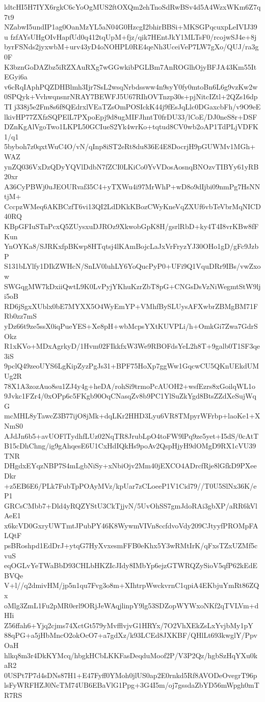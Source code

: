 ldtcHI5H7IYX6rgkC6cYoOgMUS2ftOXQm2ehTnoSdRwBSv4d5A4WzxWKm6Z7q7t9
NZabwI5undIP1ag0OanMzYL5aN04G0HzcgI2bhirBBSi+MKSGPqcuxpLeIVIJ39u
fzfAYsUHgOIvHapfUd0q412tqUpM+fjz/qik7HEntJkY1MLTsF0/rcojwSJ4e+8j
byrFSNds2jyxwbM+urv43yD4oNOHPL0RE4qeNh3UceiVeP7LW7gXo/QUJ/ra3g0F
K3bznGoDAZbz5iRZXAuRXg7wGGwkibPGLBm7AnROGlhOjyBFJA43Km55ItEGyi6a
v6cRqIAphPQZDHBlmh3Ijr7SsL2wsqNrbdssww4n9syY0fy0mtoBn6L6g9vzKw2w
0SPQyk+VvhwqnsnrNRAY7BEWFJ5U67RIhOVTnzp30s+pjNitcIZtl+2QZs16dpTI
j338j5e2Fm8s6f8QEdrxlVEaTZsOmPOSIckK44j9fEsJqLlc0DGaxcbFh/v9O9eE
lkivHP77ZXfzSQPElL7PXpoEpj9d8ugMIFJhntT0frDU33/lCoE/DJ0neS8r+DSF
DZnKgAlVgoTwo1LKPL50GCIueS2Yk4wrKo+tqtud8CV0wb2oAP1TdPLjVDFK1/q1
5byboh7z0qxtWuC4O/vN/qInp8iST2eRt8du836E4E8DocrjH9pGUWMv1MGh+WAZ
ynZQ036VxDzQDyYQVlDdbN7fZCI0LKiCo0YvVDosAosnqBNOzvTIBYy61yRB20xr
A36CyPBWj0uJEOURvaf35C4+yTXWu4i97MrWhP+wD8o9dIjbi09nmPg7HsNNtjM+
CccpzWMeq6AKBCzfT6vi13QI2LdDKkKBozCWyKneVqZXUf6vbTeVbrMqNICD40RQ
KBpGFIuSTnPcxQ5ZUysxuDJROz9XkwobGpK8H/gsrlRbD+ky4T4I8vrKBw8fFKun
YnOYKa8/SJRKxfpBKwp8HTqtsj4lKAmBojcLaJxVrFryzYJ30OHo1gD/gFc9JzbP
S131bLYlfy1DIkZWHcN/SnLV0luhLY6YoQucPyP0+UFi9Q1VquDRr9IBs/vwZxow
SWGqgMW7kDxiiQwtL9K0LvPyjYKhuKzrZbT8pG+CNGsDsVzNiWegmtStW9lji5oB
RD6jSgxXUblx0bE7MYXX5O4WyEmYP+VMhfBySLUysAFXwbrZBMgBM71FRb0zz7mS
yDz66t9ze5ssX0iqPueYES+Xe8pH+wbMcpsYXtKUVPLi/h+OmkGi7Zwa7GdrSOkz
R1xKVo+MDxAgrkyD/1Hvm02FIkkfxW3We9RBOFdsYeL2h8T+9galb0T1SF3qe3iS
9pclQ49zeoUYS6LgKipZyzPgJs31+BPF75HoXp7ggWw1GqcwCU5QKnUEkdUMUg2R
78X1A3zozAuo8su1ZJ4y4g+heDA/rohSi9trmoPcAUOH2+wsfEzrs8xGoilqWL1o
9Jvkc1FZr4/0xOPp6c5FKgb90OqCNasqZv8b9PC1YlSuZkYgd8BtsZZdXeSujWqG
mcMHL8yTawcZ3B77ijO8jMk+dqLKr2HHD3Lyu6VR8TMpyrWFrbp+laoKe1+XNmS0
AJdJn6b5+avUOFlTydhfLUz02NqTR8JrubLpO4toFW9lPq9ze5yet+I5dS/0cAtT
B15cDhChng/ig9gAhqesE6U1CxHdIQkHs9poAv2QspHjyH9dOMgD9RX1cVU39TNR
DHgdxEYqzNBP7S4mLgbNiSy+xNbiOjv2Mm40jEXCO4ADrcfRje8lGfkD9PXeeDkr
+z5EB6E6/PLk7FubTpPOAyMVz/kpUar7zCLoeeP1V1Cid79//T0U5SlNx36K/eP1
GRCsCMbb7+Dld4yRQZYStU3CkTjjvN/5UvOhSS7gmJdoRAi3gbXP/aRR6kVlAeE1
x6kcVD0GxryUWTmtJPubPY46K8WywmVIVn8ccfdvoVdy209CJtyyfPROMpFALQtF
psBRoshpd1EdDrJ+ytqG7HyXvxesmFFB0eKhx5Y3wRMtIrK/qFxsTZxUZMf5cvuS
eqOGLvYeTWaBbD93CHLbHKZIcJIdy8IMbYp6ejzGTWRQZySioV5qfP62kEdEBVQe
V+l//q2dmivHM/jp5n1qu7Fvg3o8m+XIhtrpWwckvrnC1qpiA4EKbjuYmRt86ZQx
oMlg3ZmL1Fu2pMR0erl9ORjJeWAqjlinpY9lg53SDZopWYWxoNKf2qTVLVm+dHIi
Z56ffah6+Yjq2cjms74XctGt579yMvfflvjvG1HRYx/7O2VhXEkZsLxYvjbMy1pY
88qPG+a5jHbMncO2okOcO7+a7gdXz/k93LCEd8JXKBF/QHlLt693kwglY/PpvOaH
hlkq8m3r4DkKYMcq/hbgkHCbLKKFasDeqduMoof2P/V3P2Qz/hgbSzHqYXu0kaR2
0USPt7P7d4sDNs87H1+E47Fyff0YMoh0jlUS0ap2E0rnkd5Rf8AVODeOvegrT96p
lsFyWRFHZJ0NcTM74UB6EBaVlG1Ppg+3G4I5m/oj7gssdaZbYD56mWpgh0mTR7RS
